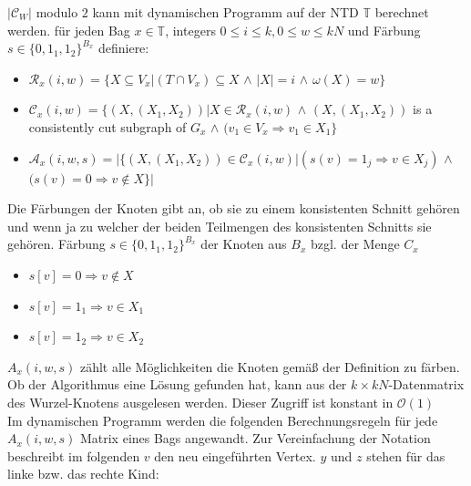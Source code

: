 $|\mathcal{C}_W|$ modulo $2$ kann mit dynamischen Programm auf der NTD $\mathbb{T}$ berechnet werden.
für jeden Bag $x \in \mathbb{T}$, integers $0 \leq i \leq k,0 \leq w \leq kN$ und Färbung $s \in \{0,1_1,1_2 \}^{B_x}$ definiere:
\begin{itemize}
\item $\mathcal{R}_x(i,w)=\{X \subseteq V_x | (T \cap V_x) \subseteq X$ $\wedge$ $|X| = i$ $\wedge$ $\omega (X) = w \}$
\item $\mathcal{C}_x (i,w) =\{ (X,(X_1,X_2)) | X \in \mathcal{R}_x(i,w)$ $\wedge$ $(X,(X_1,X_2))$ is a consistently cut subgraph of $G_x$ $\wedge$ $(v_1 \in V_x \Rightarrow v_1 \in X_1 \} $
\item $\mathcal{A}_x(i,w,s)=| \{ (X,(X_1,X_2)) \in \mathcal{C}_x(i,w) | (s(v) = 1_j \Rightarrow v \in X_j)$ $\wedge$ $(s(v)=0 \Rightarrow v \notin X \} |$
\end{itemize}
Die Färbungen der Knoten gibt an, ob sie zu einem konsistenten Schnitt gehören und wenn ja zu welcher der beiden Teilmengen des konsistenten Schnitts sie gehören.
Färbung $s \in \{0,1_1,1_2 \}^{B_x}$  der Knoten aus $B_x$ bzgl. der Menge $C_x$
\begin{itemize}
\item $s[v] = 0 \Rightarrow v \notin X$
\item $s[v] = 1_1 \Rightarrow v \in X_1$ 
\item $s[v] = 1_2 \Rightarrow v \in X_2$ 
\end{itemize}
$A_x(i,w,s)$ zählt alle Möglichkeiten die Knoten gemäß der Definition zu färben.
Ob der Algorithmus eine Lösung gefunden hat, kann aus der $k \times kN$-Datenmatrix des Wurzel-Knotens ausgelesen werden. Dieser Zugriff ist konstant in $\mathcal{O}(1)$\\
Im dynamischen Programm werden die folgenden Berechnungsregeln für jede $A_x(i,w,s)$ Matrix eines Bags angewandt. Zur Vereinfachung der Notation beschreibt im folgenden $v$ den neu eingeführten Vertex. $y$ und $z$ stehen für das linke bzw. das rechte Kind:
